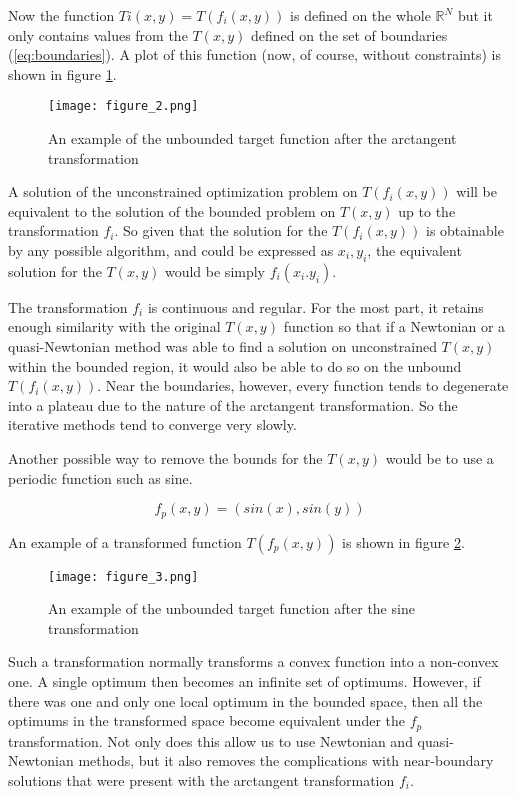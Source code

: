 \documentclass[
	a4paper, %
	10pt, %
	unnumberedsections, %
	twoside, %
]{LTJournalArticle}
\begin{document}
Now the function $Ti(x,y) = T(f_i(x, y))$ is defined on the whole $\mathbb{R}^N$ but it only contains values from the $T(x, y)$ defined on the set of boundaries (\ref{eq:boundaries}). A plot of this function (now, of course, without constraints) is shown in figure \ref{fig:after_fi}. 

\begin{figure} 
	\texttt{[image: figure\_2.png]}
	\caption{An example of the unbounded target function after the arctangent transformation}
	\label{fig:after_fi}
\end{figure}

A solution of the unconstrained optimization problem on $T(f_i(x, y))$ will be equivalent to the solution of the bounded problem on $T(x, y)$ up to the transformation $f_i$. So given that the solution for the $T(f_i(x, y))$ is obtainable by any possible algorithm, and could be expressed as $x_i, y_i$, the equivalent solution for the $T(x, y)$ would be simply $f_i(x_i. y_i)$.

The transformation $f_i$ is continuous and regular. For the most part, it retains enough similarity with the original $T(x, y)$ function so that if a Newtonian or a quasi-Newtonian method was able to find a solution on unconstrained $T(x, y)$ within the bounded region, it would also be able to do so on the unbound $T(f_i(x, y))$. Near the boundaries, however, every function tends to degenerate into a plateau due to the nature of the arctangent transformation. So the iterative methods tend to converge very slowly.

Another possible way to remove the bounds for the $T(x, y)$ would be to use a periodic function such as sine.

\begin{equation}
	f_p(x, y) = (sin(x), sin(y))
	\label{eq:sine_2d}
\end{equation}

An example of a transformed function $T(f_p(x, y))$ is shown in figure \ref{fig:after_pi}. 

\begin{figure} 
	\texttt{[image: figure\_3.png]}
	\caption{An example of the unbounded target function after the sine transformation}
	\label{fig:after_pi}
\end{figure}

Such a transformation normally transforms a convex function into a non-convex one. A single optimum then becomes an infinite set of optimums. However, if there was one and only one local optimum in the bounded space, then all the optimums in the transformed space become equivalent under the $f_p$ transformation. Not only does this allow us to use Newtonian and quasi-Newtonian methods, but it also removes the complications with near-boundary solutions that were present with the arctangent transformation $f_i$.
\end{document}
